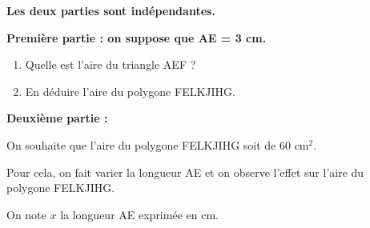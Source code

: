 \documentclass[11pt]{article}
\begin{document}
\medskip

\textbf{Les deux parties sont indépendantes.}

\medskip

\textbf{Première partie : on suppose que AE = 3 cm.}

\begin{enumerate}
\item Quelle est l'aire du triangle AEF ?
\item En déduire l'aire du polygone FELKJIHG.
\end{enumerate}

\medskip

\textbf{Deuxième partie :}

On souhaite que l'aire du polygone FELKJIHG soit de 60 cm$^2$.

Pour cela, on fait varier la longueur AE et on observe l'effet sur l'aire du polygone FELKJIHG.

On note $x$ la longueur AE exprimée en cm.
\end{document}
